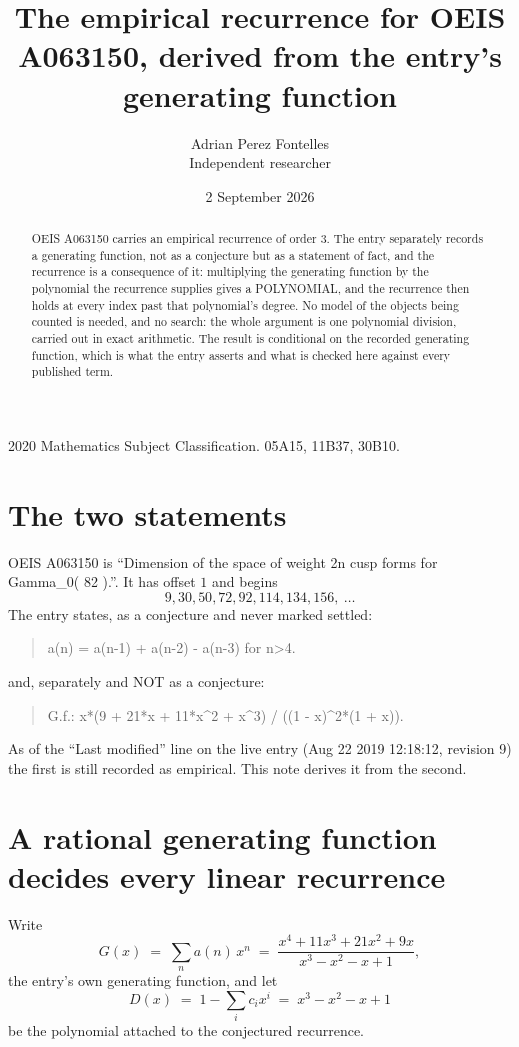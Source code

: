 \documentclass[11pt,a4paper]{article}
\title{The empirical recurrence for OEIS A063150, derived from the entry's generating function}
\author{Adrian Perez Fontelles\\ \small Independent researcher}
\date{2 September 2026}
\theoremstyle{plain}
\theoremstyle{definition}
\begin{document}
\maketitle

\begin{abstract}
OEIS A063150 carries an empirical recurrence of order $3$. The entry separately records a
generating function, not as a conjecture but as a statement of fact, and the recurrence is a
consequence of it: multiplying the generating function by the polynomial the recurrence
supplies gives a POLYNOMIAL, and the recurrence then holds at every index past that
polynomial's degree. No model of the objects being counted is needed, and no search: the
whole argument is one polynomial division, carried out in exact arithmetic. The result is
conditional on the recorded generating function, which is what the entry asserts and what is
checked here against every published term.
\end{abstract}

\noindent\small 2020 Mathematics Subject Classification. 05A15, 11B37, 30B10.\normalsize

\section{The two statements}

OEIS A063150 is ``Dimension of the space of weight 2n cusp forms for Gamma\_0( 82 ).''. It has offset $1$ and begins
\[
9, 30, 50, 72, 92, 114, 134, 156,\ \dots
\]
The entry states, as a conjecture and never marked settled:
\begin{quote}
a(n) = a(n-1) + a(n-2) - a(n-3) for n>4.
\end{quote}
and, separately and NOT as a conjecture:
\begin{quote}
G.f.: x*(9 + 21*x + 11*x\^{}2 + x\^{}3) / ((1 - x)\^{}2*(1 + x)).
\end{quote}
As of the ``Last modified'' line on the live entry (Aug 22 2019 12:18:12, revision 9) the first is still
recorded as empirical. This note derives it from the second.

\section{A rational generating function decides every linear recurrence}

Write
\[
G(x)\;=\;\sum_{n}a(n)\,x^{n}\;=\;\frac{x^{4} + 11 x^{3} + 21 x^{2} + 9 x}{x^{3} - x^{2} - x + 1},
\]
the entry's own generating function, and let
\[
D(x)\;=\;1-\sum_i c_i x^{i}\;=\;x^{3} - x^{2} - x + 1
\]
be the polynomial attached to the conjectured recurrence.
\end{document}
